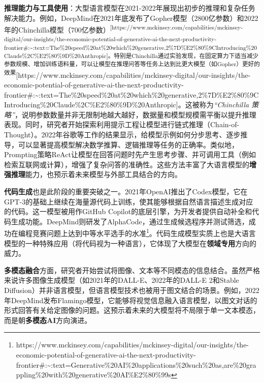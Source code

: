 \documentclass[
  letterpaper,
]{scrbook}
\begin{document}
\textbf{推理能力与工具使用}：大型语言模型在2021-2022年展现出初步的推理和复杂任务解决能力。例如，DeepMind在2021年底发布了Gopher模型（2800亿参数）和2022年的Chinchilla模型（700亿参数）\textsuperscript{{[}https://www.mckinsey.com/capabilities/mckinsey-digital/our-insights/the-economic-potential-of-generative-ai-the-next-productivity-frontier\#:\textasciitilde:text=The\%20speed\%20at\%20which\%20generative,2\%7D\%E2\%80\%9CIntroducing\%20Claude\%2C\%E2\%80\%9D\%20Anthropic{]}。特别是Chinchilla通过实验发现，在固定算力下适当减少参数规模、增加训练语料量，可以让模型在推理问答等任务上达到比更大模型（如Gopher）更好的效果}{[}https://www.mckinsey.com/capabilities/mckinsey-digital/our-insights/the-economic-potential-of-generative-ai-the-next-productivity-frontier\#:\textasciitilde:text=The\%20speed\%20at\%20which\%20generative,2\%7D\%E2\%80\%9CIntroducing\%20Claude\%2C\%E2\%80\%9D\%20Anthropic{]}。这被称为\emph{``Chinchilla
策略''}，说明参数数量并非无限制地越大越好，数据量和模型规模需平衡以提升推理表现。同时，研究者开始探索利用提示工程让模型进行链式推理（Chain-of-Thought）。2022年谷歌等工作的结果显示，给模型示例如何分步思考、逐步推导，可以显著提高模型解决数学推算、逻辑推理等任务的正确率。类似地，Prompting策略ReAct让模型在回答问题时先产生思考步骤、并可调用工具（例如检索互联网或计算），增强了复杂问答的准确性。这些方法丰富了大语言模型的\textbf{增强推理}能力，也预示着未来模型与外部工具结合的方向。

\textbf{代码生成}也是此阶段的重要突破之一。2021年OpenAI推出了Codex模型，它在GPT-3的基础上继续在海量源代码上训练，使其能够根据自然语言描述生成对应的代码。这一模型被用作GitHub
Copilot的底层引擎，为开发者提供自动补全和代码生成功能。DeepMind则研发了AlphaCode，通过生成候选程序并测试筛选，成功在编程竞赛问题上达到中等水平选手的水准\footnote{https://www.mckinsey.com/capabilities/mckinsey-digital/our-insights/the-economic-potential-of-generative-ai-the-next-productivity-frontier\#:\textasciitilde:text=Generative\%20AI\%20applications\%20such\%20as,are\%20grappling\%20with\%20generative\%20AI\%E2\%80\%99s}。代码生成模型实质上也是大语言模型的一种特殊应用（将代码视为一种语言），它体现了大模型在\textbf{领域专用}方向的威力。

\textbf{多模态融合}方面，研究者开始尝试将图像、文本等不同模态的信息结合。虽然严格来说许多图像生成模型（如2021年的DALL-E、2022年的DALL-E
2和Stable
Diffusion）并非语言模型，但语言模型技术也被用于图文结合的场景。例如，2022年DeepMind发布Flamingo模型，它能够将视觉信息融入语言模型，以图文对话的形式回答有关给定图像的问题。这预示着未来的大模型将不局限于单一文本模态，而是朝\textbf{多模态AI}方向演进。
\end{document}
